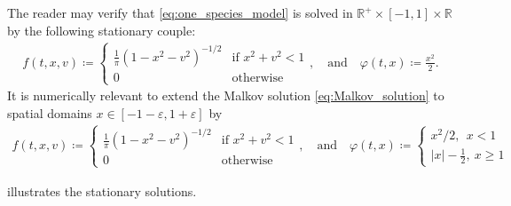 \documentclass{article}
\numberwithin{equation}{section}
\newcommand{\R}{\mathbb{R}}
\begin{document}
The reader may verify that \cref{eq:one_species_model} is solved in $\R^+ \times [-1,1] \times \mathbb{R}$ by the following stationary couple:
\begin{align}\label{eq:Malkov_solution}
	f(t,x,v) \coloneqq 
	\begin{cases}
		\frac{1}{\pi} \left(1 - x^2 - v^2\right)^{-1/2} & \text{if } x^2 + v^2 < 1 \\
		0 & \text{otherwise}
	\end{cases}, \quad \text{and} \quad
	\varphi(t,x) \coloneqq \frac{x^2}{2}.
\end{align}
It is numerically relevant to extend the Malkov solution \cref{eq:Malkov_solution} to spatial domains $x \in [-1-\varepsilon, 1+\varepsilon]$ by 
\begin{align}\label{eq:Malkov_solution_ext}
	f(t,x,v) \coloneqq 
	\begin{cases}
		\frac{1}{\pi} \left(1 - x^2 - v^2\right)^{-1/2} & \text{if } x^2 + v^2 < 1 \\
		0 & \text{otherwise}
	\end{cases}, \quad \text{and} \quad
	\varphi(t,x) \coloneqq \left\{\begin{array}{c}
	x^2/2,\ \ x<1\\
	|x|-\frac{1}{2},\ x\ge 1
	\end{array}\right.%
\end{align}

 illustrates the stationary solutions.
\end{document}
